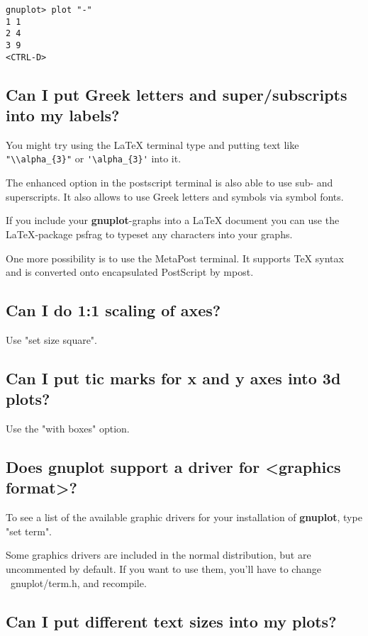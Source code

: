 \documentclass[a4paper,11pt]{article}
\newcommand{\gnuplot}{\textbf{gnuplot}}
\begin{document}
\begin{verbatim}
gnuplot> plot "-"
1 1
2 4
3 9
<CTRL-D>
\end{verbatim}


\subsection{Can I put Greek letters and super/subscripts into my
labels?}

You might try using the \LaTeX{} terminal type and putting text
like \verb+"\\alpha_{3}"+ or \verb+'\alpha_{3}'+ into it.

The enhanced option in the postscript terminal is also able to use sub-
and superscripts. It also allows to use Greek letters and symbols
via symbol fonts.

If you include your \gnuplot-graphs into a \LaTeX{} document
you can use the \LaTeX{}-package psfrag to typeset any characters
into your graphs.

One more possibility is to use the MetaPost terminal. It supports \TeX{}
syntax and is converted onto encapsulated PostScript by mpost.


\subsection{Can I do 1:1 scaling of axes?}

Use "set size square".


\subsection{Can I put tic marks for x and y axes into 3d plots?}

Use the "with boxes" option.


\subsection{Does \gnuplot{} support a driver for <graphics format>?}

To see a list of the available graphic drivers for your
installation of \gnuplot{}, type "set term".

Some graphics drivers are included in the normal distribution,
but are uncommented by default. If you want to use them, you'll
have to change ~gnuplot/term.h, and recompile.


\subsection{Can I put different text sizes into my plots?}
\end{document}
